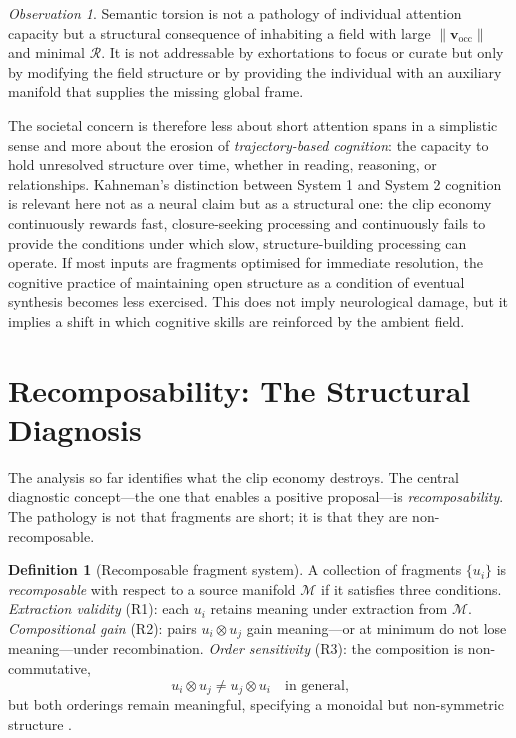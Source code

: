 \documentclass{amsart}
\theoremstyle{plain}
\theoremstyle{definition}
\newtheorem{definition}[theorem]{Definition}
\theoremstyle{remark}
\newtheorem{observation}[theorem]{Observation}
\newcommand{\vocc}{\mathbf{v}_{\!\text{occ}}}
\newcommand{\Man}{\mathcal{M}}
\newcommand{\Rec}{\mathcal{R}}
\newcommand{\tensor}{\otimes}
\begin{document}
\begin{observation}
  Semantic torsion is not a pathology of individual attention capacity but a
  structural consequence of inhabiting a field with large $\|\vocc\|$ and minimal
  $\Rec$.  It is not addressable by exhortations to focus or curate but only by
  modifying the field structure or by providing the individual with an auxiliary
  manifold that supplies the missing global frame.
\end{observation}

The societal concern is therefore less about short attention spans in a simplistic
sense and more about the erosion of \emph{trajectory-based cognition}: the capacity
to hold unresolved structure over time, whether in reading, reasoning, or
relationships.  Kahneman's distinction between System 1 and System 2 cognition
\cite{kahneman2011} is relevant here not as a neural claim but as a structural one:
the clip economy continuously rewards fast, closure-seeking processing and
continuously fails to provide the conditions under which slow, structure-building
processing can operate.  If most inputs are fragments optimised for immediate
resolution, the cognitive practice of maintaining open structure as a condition of
eventual synthesis \cite{clark2013} becomes less exercised.  This does not imply
neurological damage, but it implies a shift in which cognitive skills are
reinforced by the ambient field.

\section{Recomposability: The Structural Diagnosis}
\label{sec:recomposability}

The analysis so far identifies what the clip economy destroys.  The central
diagnostic concept---the one that enables a positive proposal---is
\emph{recomposability}.  The pathology is not that fragments are short; it is that
they are non-recomposable.

\begin{definition}[Recomposable fragment system]
  \label{def:recomposable}
  A collection of fragments $\{u_i\}$ is \emph{recomposable} with respect to a
  source manifold $\Man$ if it satisfies three conditions.  \emph{Extraction
  validity} (R1): each $u_i$ retains meaning under extraction from $\Man$.
  \emph{Compositional gain} (R2): pairs $u_i \tensor u_j$ gain meaning---or at
  minimum do not lose meaning---under recombination.  \emph{Order sensitivity}
  (R3): the composition is non-commutative,
  \[
    u_i \tensor u_j \neq u_j \tensor u_i \quad \text{in general,}
  \]
  but both orderings remain meaningful, specifying a monoidal but non-symmetric
  structure \cite{maclane1998,baez2011}.
\end{definition}
\end{document}
